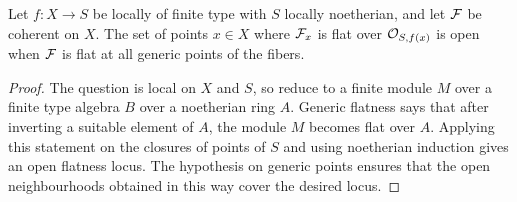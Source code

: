 \begin{proposition}
Let \(f:X\to S\) be locally of finite type with \(S\) locally noetherian, and
let \(\mathcal{F}\) be coherent on \(X\).  The set of points \(x\in X\) where \(\mathcal{F}_x\)
is flat over \(\mathcal{O}_{S,f(x)}\) is open when \(\mathcal{F}\) is flat at all generic points
of the fibers.
\end{proposition}

\begin{proof}
The question is local on \(X\) and \(S\), so reduce to a finite module \(M\) over
a finite type algebra \(B\) over a noetherian ring \(A\).  Generic flatness says
that after inverting a suitable element of \(A\), the module \(M\) becomes flat
over \(A\).  Applying this statement on the closures of points of \(S\) and
using noetherian induction gives an open flatness locus.  The hypothesis on
generic points ensures that the open neighbourhoods obtained in this way cover
the desired locus.
\end{proof}
